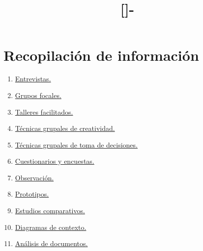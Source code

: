 \documentclass{templateApunte}
\newcounter{counter_comentario}
\newcounter{counter_observacion}
\begin{document}
\setcounter{counter_comentario}{1}
\setcounter{counter_observacion}{1}


\title{[\asignatura]-\titulo}
\author{
    \autor
}
\portada
\margenes %

\section{Recopilación de información}
\begin{enumerate}
  \item \hyperlink{entrevista}{Entrevistas.} 
  \item \hyperlink{grupos_focales}{Grupos focales.}
  \item \hyperlink{talleres_facilitados}{Talleres facilitados.}
  \item \hyperlink{tecnicas_grupales_de_creatividad}{Técnicas grupales de creatividad.}
  \item \hyperlink{tecnicas_grupales_de_toma_de_decisiones}{Técnicas grupales de toma de decisiones.}
  \item \hyperlink{cuestionarios_y_encuestas}{Cuestionarios y encuestas.}
  \item \hyperlink{observacion}{Observación.}
  \item \hyperlink{prototipos}{Prototipos.}
  \item \hyperlink{estudios_comparativos}{Estudios comparativos.}
  \item \hyperlink{diagramas_de_contexto}{Diagramas de contexto.}
  \item \hyperlink{analisis_de_documentos}{Análisis de documentos.}
\end{enumerate}
\end{document}
